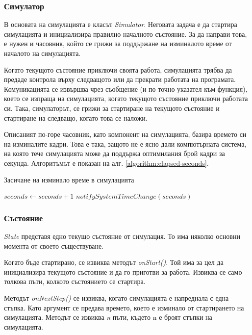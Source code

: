 		\subsubsection{Симулатор}		
		
		В основата на симулацията е класът \emph{Simulator}. Неговата задача е да стартира симулацията
		и инициализира правилно началното състояние. За да направи това, е нужен и часовник, който се грижи
		за поддържане на изминалото време от началото на симулацията. 
		
		Когато текущото състояние приключи своята работа, симулацията трябва да предаде контрола върху следващото или да прекрати работата
		на програмата. Комуникацията се извършва чрез съобщение (и по-точно указател към функция), което
		се изпраща на симулацията, когато текущото състояние приключи работата си. Така, симулаторът,
		се грижи за стартиране на текущото състояние и стартиране на следващо, когато това се наложи.
		
		Описаният по-горе часовник, като компонент на симулацията, базира времето си
		на изминалите кадри. Това е така, защото не е ясно дали компютърната система,
		на която тече симулацията може да поддържа оптимилания брой кадри за секунда.
		Алгоритъмът е показан на алг. \ref{algorithm:elapsed-seconds}.

		\begin{algorithm}				
			\caption{Засичане на изминало време в симулацията}				
			\label{algorithm:elapsed-seconds}
			\begin{algorithmic}
					\State $seconds\gets seconds+1$
					\State $notifySystemTimeChange(seconds)$
				\EndIf
			\end{algorithmic}
		\end{algorithm}
		
		\subsubsection{Състояние}					
		
			\emph{State} представя едно текущо състояние от симулация. То има няколко основни момента от своето съществуване.
			 
			Когато бъде стартирано, се извиква методът \emph{onStart()}. Той има за цел да инициализира текущото състояние и да го приготви за работа.
			Извиква се само толкова пъти, колкото състоянието се стартира. 
			
			Методът \emph{onNextStep()} се извиква, когато симулацията е напреднала 
			с една стъпка. Като аргумент се предава времето, което е изминало от стартирането на симулацията. 
			Методът се извиква \emph{n} пъти, където n е броят стъпки на симулацията. 
			

